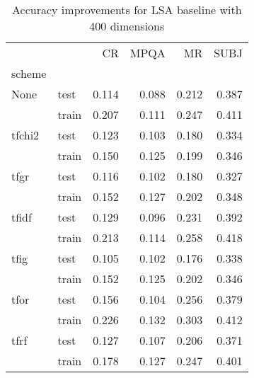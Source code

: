 \begin{table}[H]
\begin{center}

\begin{tabular}{llrrrr}
\toprule
{} &      &  CR &  MPQA &  MR &  SUBJ \\
scheme &  &            &              &            &              \\
\midrule
None & test &      0.114 &        0.088 &      0.212 &        0.387 \\
{} & train &      0.207 &        0.111 &      0.247 &        0.411 \\
tfchi2 & test &      0.123 &        0.103 &      0.180 &        0.334 \\
{} & train &      0.150 &        0.125 &      0.199 &        0.346 \\
tfgr & test &      0.116 &        0.102 &      0.180 &        0.327 \\
{} & train &      0.152 &        0.127 &      0.202 &        0.348 \\
tfidf & test &      0.129 &        0.096 &      0.231 &        0.392 \\
{} & train &      0.213 &        0.114 &      0.258 &        0.418 \\
tfig & test &      0.105 &        0.102 &      0.176 &        0.338 \\
{} & train &      0.152 &        0.125 &      0.202 &        0.346 \\
tfor & test &      0.156 &        0.104 &      0.256 &        0.379 \\
{} & train &      0.226 &        0.132 &      0.303 &        0.412 \\
tfrf & test &      0.127 &        0.107 &      0.206 &        0.371 \\
{} & train &      0.178 &        0.127 &      0.247 &        0.401 \\
\bottomrule
\end{tabular}

\caption[Accuracy improvements for LSA baseline with 400 dimensions]{Accuracy improvements for LSA baseline with 400 dimensions}
\label{tab:lsa:resuts:400}
\end{center}
\end{table}






